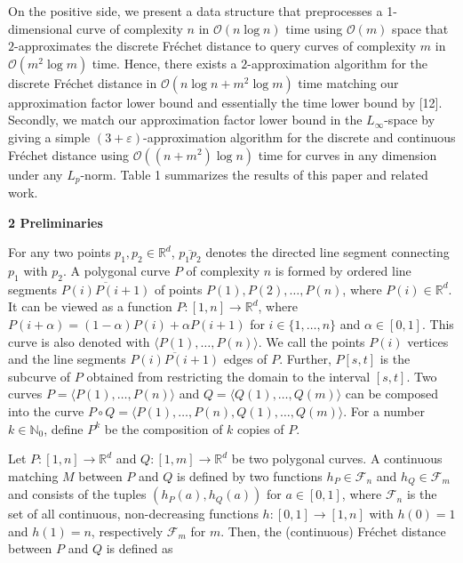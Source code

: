 \par
\par
On the positive side, we present a data structure that preprocesses a 1-dimensional curve of complexity $n$ in $\mathcal{O}(n\log n)$ time using $\mathcal{O}(m)$ space that $2$-approximates the discrete Fréchet distance to query curves of complexity $m$ in $\mathcal{O}(m^{2}\log m)$ time. Hence, there exists a $2$-approximation algorithm for the discrete Fréchet distance in $\mathcal{O}(n\log n+m^{2}\log m)$ time matching our approximation factor lower bound and essentially the time lower bound by [12]. Secondly, we match our approximation factor lower bound in the $L_{\infty}$-space by giving a simple $(3+\varepsilon)$-approximation algorithm for the discrete and continuous Fréchet distance using $\mathcal{O}((n+m^{2})\log n)$ time for curves in any dimension under any $L_{p}$-norm. Table 1 summarizes the results of this paper and related work.
\par
\par
\par\medskip\noindent\textbf{2 Preliminaries}\par
For any two points $p_{1},p_{2}\in\mathbb{R}^{d}$, $\overline{p_{1}p_{2}}$ denotes the directed line segment connecting $p_{1}$ with $p_{2}$. A polygonal curve $P$ of complexity $n$ is formed by ordered line segments $\overline{P(i)P(i+1)}$ of points $P(1),P(2),\dotso,P(n)$, where $P(i)\in\mathbb{R}^{d}$. It can be viewed as a function $P:[1,n]\rightarrow\mathbb{R}^{d}$, where $P(i+\alpha)=(1-\alpha)P(i)+\alpha P(i+1)$ for $i\in\{1,\dotso,n\}$ and $\alpha\in[0,1]$. This curve is also denoted with $\langle P(1),\dotso,P(n)\rangle$. We call the points $P(i)$ vertices and the line segments $\overline{P(i)P(i+1)}$ edges of $P$. Further, $P[s,t]$ is the subcurve of $P$ obtained from restricting the domain to the interval $[s,t]$. Two curves $P=\langle P(1),\dots,P(n)\rangle$ and $Q=\langle Q(1),\dots,Q(m)\rangle$ can be composed into the curve $P\circ Q=\langle P(1),\dots,P(n),Q(1),\dots,Q(m)\rangle$. For a number $k\in\mathbb{N}_{0}$, define $P^{k}$ be the composition of $k$ copies of $P$.
\par
\par
Let $P:[1,n]\rightarrow\mathbb{R}^{d}$ and ${Q:[1,m]\rightarrow\mathbb{R}^{d}}$ be two polygonal curves. A continuous matching $M$ between $P$ and $Q$ is defined by two functions $h_{P}\in\mathcal{F}_{n}$ and $h_{Q}\in\mathcal{F}_{m}$ and consists of the tuples $(h_{P}(a),h_{Q}(a))$ for $a\in[0,1]$, where $\mathcal{F}_{n}$ is the set of all continuous, non-decreasing functions $h:[0,1]\rightarrow[1,n]$ with ${h(0)=1}$ and $h(1)=n$, respectively $\mathcal{F}_{m}$ for $m$. Then, the (continuous) Fréchet distance between $P$ and $Q$ is defined as
